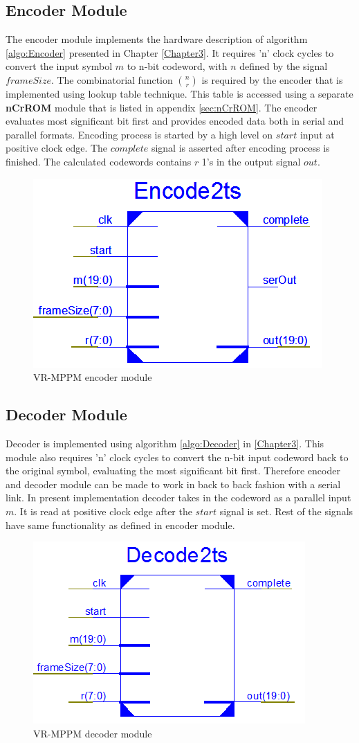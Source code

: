 \subsection{Encoder Module}
The encoder module implements the hardware description of algorithm \ref{algo:Encoder} presented in Chapter \ref{Chapter3}. It requires 'n' clock cycles to convert the input symbol $m$ to n-bit codeword, with $n$ defined by the signal $frameSize$. The combinatorial function $\binom{n}{r}$ is required by the encoder that is implemented using lookup table technique. This table is accessed using a separate \textbf{nCrROM} module that is listed in appendix \ref{sec:nCrROM}. The encoder evaluates most significant bit first and provides encoded data both in serial and parallel formats. Encoding process is started by a high level on $start$ input at positive clock edge. The $complete$ signal is asserted after encoding process is finished. The calculated codewords contains $r$ 1's in the output signal $out$.
\begin{figure}[!htbp]
	\centering
	\includegraphics[width=.5\textwidth]{./Figures/Encode2ts.png}
	\caption{VR-MPPM encoder module}
	\label{fig:Encode2ts}
\end{figure}
\subsection{Decoder Module}
Decoder is implemented using algorithm \ref{algo:Decoder} in \ref{Chapter3}. This module also requires 'n' clock cycles to convert the n-bit input codeword back to the original symbol, evaluating the most significant bit first. Therefore encoder and decoder module can be made to work in back to back fashion with a serial link. In present implementation decoder takes in the codeword as a parallel input $m$. It is read at positive clock edge after the $start$ signal is set. Rest of the signals have same functionality as defined in encoder module.

\begin{figure}[!htbp]
	\centering
	\includegraphics[width=.5\textwidth]{./Figures/Decode2ts.png}
	\caption{VR-MPPM decoder module}
	\label{fig:Decode2ts}
\end{figure}


